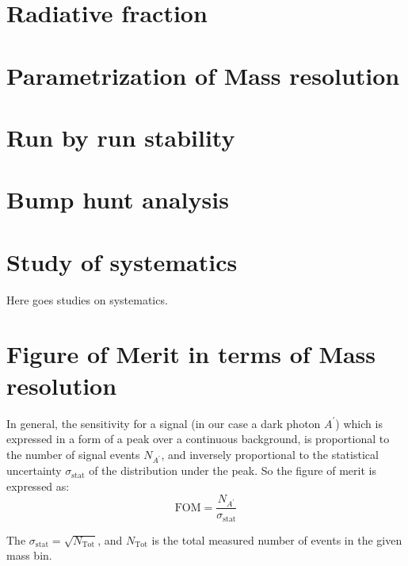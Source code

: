 \documentclass[letterpaper,12pt]{article}
\def \dstl {\displaystyle}
\begin{document}
\clearpage

\section{Radiative fraction}

\section{Parametrization of Mass resolution}

\section{Run by run stability} 


\section{Bump hunt analysis}


\section{Study of systematics}
Here goes studies on systematics.




\appendix
\appendixpage
\addappheadtotoc
\section{Figure of Merit in terms of Mass resolution}
\label{sec:AppendixFOM}
In general, the sensitivity for a signal (in our case a dark photon $A^{\prime}$) which is expressed in a form of a peak over a continuous background, is proportional to the number of signal events $\dstl N_{A^{\prime}}$, and inversely proportional to the statistical uncertainty $\sigma_{\mathrm{stat}}$ of the distribution under the peak.
So the figure of merit is expressed as:
\begin{equation}
 \mathrm{FOM} = \frac{\dstl N_{A^{\prime}}}{\dstl \sigma_{\mathrm{stat}}}
 \label{eq:FOM_massres}
\end{equation}

The $\sigma_{\mathrm{stat}} = \sqrt{N_{\mathrm{Tot}}}$, and $N_{\mathrm{Tot}}$ is the total measured number of events in the given mass bin.
\end{document}
